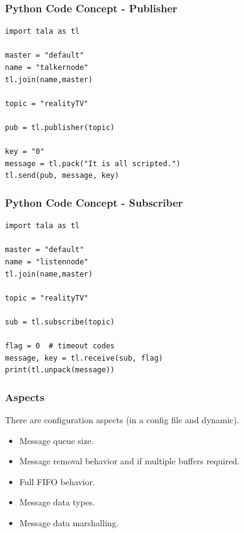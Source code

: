 \documentclass[xcolor=svgnames]{beamer}
\begin{document}
\begin{frame}[fragile]
  \frametitle{Python Code Concept - Publisher}
\begin{verbatim}
import tala as tl

master = "default"
name = "talkernode"
tl.join(name,master)

topic = "realityTV"

pub = tl.publisher(topic)

key = "0"
message = tl.pack("It is all scripted.")
tl.send(pub, message, key)

\end{verbatim}
\end{frame}



\begin{frame}[fragile]
  \frametitle{Python Code Concept - Subscriber}
\begin{verbatim}
import tala as tl

master = "default"
name = "listennode"
tl.join(name,master)

topic = "realityTV"

sub = tl.subscribe(topic)

flag = 0  # timeout codes
message, key = tl.receive(sub, flag)
print(tl.unpack(message))

\end{verbatim}
\end{frame}



\begin{frame}[fragile]
  \frametitle{Aspects}

There are configuration aspects (in a config file and dynamic).
\begin{itemize}
\item Message queue size.
\item Message removal behavior and if multiple buffers required.
\item Full FIFO behavior.
\item Message data types.
\item Message data marshalling.
\end{itemize}

\end{frame}


\end{document}
